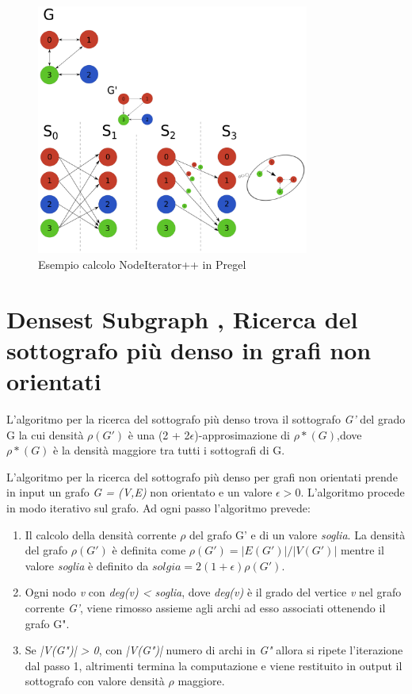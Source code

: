 \documentclass[LaM,binding=0.6cm]{sapthesis}
\begin{document}
\begin{figure}
\centering
 \includegraphics[width=0.8\textwidth]{pregel-trianglepp}
\caption{Esempio calcolo NodeIterator++ in Pregel}
\label{fig:PREGELNIT}
\end{figure}

\section{Densest Subgraph , Ricerca del sottografo più denso in grafi non orientati}

L'algoritmo per la ricerca del sottografo più denso \cite{Bahmani:2012:DSS:2140436.2140442} trova il sottografo \textit{G'} del grado G la cui densità $\rho(G')$ è una  (2 + 2$\epsilon$)-approsimazione di $\rho*(G)$,dove $\rho*(G)$ è la densità maggiore tra tutti i sottografi di G.

L'algoritmo per la  ricerca del sottografo più denso per grafi non orientati prende in input un grafo \textit{G = (V,E)} non orientato e un valore \textit{$\epsilon > 0$}.
L'algoritmo procede in modo iterativo sul grafo. Ad ogni passo l'algoritmo prevede:
\begin{enumerate}
\item Il calcolo della densità corrente $\rho$ del grafo G' e di un valore \textit{soglia}. La densità del grafo $\rho(G')$ è definita come \textit{$\rho(G') = |E(G')| / |V(G')|$} mentre il  valore \textit{soglia}  è definito da \textit{$solgia = 2 (1 + \epsilon) \rho(G') $}.

\item Ogni nodo \textit{v} con \textit{deg(v) < soglia}, dove \textit{deg(v)} è il grado del vertice \textit{v} nel grafo corrente \textit{G'}, viene rimosso assieme agli archi ad esso associati ottenendo il grafo G".
\item Se \textit{ |V(G")| > 0}, con \textit{|V(G")|} numero di archi in \textit{G"} allora si ripete l'iterazione dal passo 1, altrimenti termina la computazione e viene restituito in output il sottografo con valore densità $\rho$ maggiore.

\end{enumerate}
\end{document}
